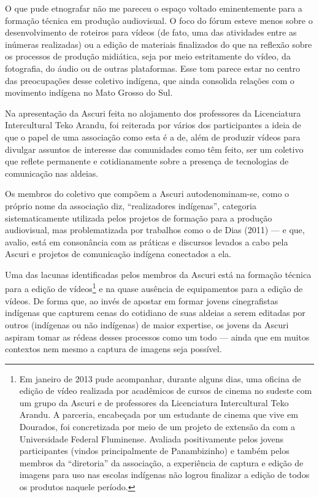 O  que pude etnografar não me pareceu o espaço voltado eminentemente
para a formação técnica em produção audiovisual. O foco do fórum esteve
menos sobre o desenvolvimento de roteiros para vídeos (de fato, uma das
atividades entre as inúmeras realizadas) ou a edição de materiais
finalizados do que na reflexão sobre os processos de produção
midiática, seja por meio estritamente do vídeo, da fotografia, do áudio
ou de outras plataformas. Esse tom parece estar no centro das
preocupações desse coletivo indígena, que ainda consolida relações com
o movimento indígena no Mato Grosso do Sul.

Na apresentação da Ascuri feita no alojamento dos professores da
Licenciatura Intercultural Teko Arandu, foi reiterada por vários dos
participantes a ideia de que o papel de uma associação como esta é a
de, além de produzir vídeos para divulgar assuntos de interesse das
comunidades como têm feito, ser um coletivo que reflete permanente e cotidianamente
sobre a presença de tecnologias de comunicação nas aldeias.

Os membros do coletivo que compõem a Ascuri autodenominam-se, como o
próprio nome da associação diz, ``realizadores indígenas'', categoria
sistematicamente utilizada pelos projetos de formação para a produção
audiovisual, mas problematizada por trabalhos como o de Dias (2011) --- e
que, avalio, está em consonância com as práticas e discursos levados a
cabo pela Ascuri e projetos de comunicação indígena conectados a ela.

Uma das lacunas identificadas pelos membros da Ascuri está na formação
técnica para a edição de vídeos\footnote{Em janeiro de 2013 pude
acompanhar, durante alguns dias, uma oficina de edição de vídeo
realizada por acadêmicos de cursos de cinema no sudeste com um grupo da
Ascuri e de professores da Licenciatura Intercultural Teko Arandu. A
parceria, encabeçada por um estudante de cinema que vive em Dourados,
foi concretizada por meio de um projeto de extensão da  com a
Universidade Federal Fluminense. Avaliada positivamente pelos jovens
participantes (vindos principalmente de Panambizinho) e também pelos
membros da ``diretoria'' da associação, a experiência de captura e edição
de imagens para uso nas escolas indígenas não logrou finalizar a edição
de todos os produtos naquele período. } e na quase ausência de
equipamentos para a edição de vídeos. De forma que, ao invés de apostar
em formar jovens cinegrafistas indígenas que capturem cenas do
cotidiano de suas aldeias a serem editadas por outros (indígenas ou não
indígenas) de maior expertise, os jovens da Ascuri aspiram tomar as
rédeas desses processos como um todo --- ainda que em muitos contextos
nem mesmo a captura de imagens seja possível.

